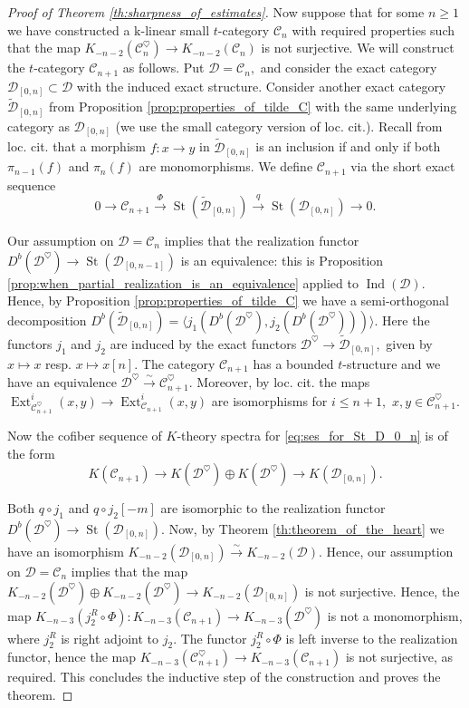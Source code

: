 \documentclass[11pt,leqno]{amsart}
\numberwithin{equation}{section}
\def\wt{\widetilde}
\newcommand{\xto}{\xrightarrow}
\newcommand{\St}{\operatorname{St}}
\newcommand{\mk}{\mathrm k}
\newcommand{\cD}{{\mathcal D}}
\newcommand{\cC}{{\mathcal C}}
\newcommand{\la}{\langle}
\newcommand{\ra}{\rangle}
\newcommand{\Ext}{\operatorname{Ext}}
\newcommand{\Ind}{\operatorname{Ind}}
\begin{document}
\begin{proof}[Proof of Theorem \ref{th:sharpness_of_estimates}]
Now suppose that for some $n\geq 1$ we have constructed a $\mk$-linear small $t$-category $\cC_n$ with required properties such that the map $K_{-n-2}(\cC_n^{\heartsuit})\to K_{-n-2}(\cC_n)$ is not surjective. We will construct the $t$-category $\cC_{n+1}$ as follows. Put $\cD=\cC_n,$ and consider the exact 
category $\cD_{[0,n]}\subset\cD$ with the induced exact structure. Consider another exact category $\wt{\cD}_{[0,n]}$ from Proposition 
\ref{prop:properties_of_tilde_C} with the same underlying category as $\cD_{[0,n]}$ (we use the small category version of loc. cit.). Recall from loc. cit. that a morphism $f:x\to y$ in $\wt{\cD}_{[0,n]}$ is an inclusion if and only if both 
$\pi_{n-1}(f)$ and $\pi_n(f)$ are monomorphisms. We define $\cC_{n+1}$ via the short exact sequence
\begin{equation}\label{eq:ses_for_St_D_0_n}
0\to\cC_{n+1}\xto{\Phi} \St(\wt{\cD}_{[0,n]})\xto{q} \St(\cD_{[0,n]})\to 0.
\end{equation}

Our assumption on $\cD=\cC_n$ implies that the realization functor $D^b(\cD^{\heartsuit})\to\St(\cD_{[0,n-1]})$ is an equivalence: this is Proposition \ref{prop:when_partial_realization_is_an_equivalence} applied to $\Ind(\cD).$ Hence, by Proposition \ref{prop:properties_of_tilde_C} we have a semi-orthogonal decomposition $D^b(\wt{\cD}_{[0,n]})=\la j_1(D^b(\cD^{\heartsuit}), j_2(D^b(\cD^{\heartsuit})))\ra.$ Here the functors $j_1$ and $j_2$ are induced by the exact functors $\cD^{\heartsuit}\to \wt{\cD}_{[0,n]},$ given by $x\mapsto x$ resp. $x\mapsto x[n].$ The category $\cC_{n+1}$ has a bounded $t$-structure and we have an equivalence $\cD^{\heartsuit}\xto{\sim}\cC_{n+1}^{\heartsuit}.$ Moreover, by loc. cit. the maps $\Ext^i_{\cC_{n+1}^{\heartsuit}}(x,y)\to \Ext^i_{\cC_{n+1}}(x,y)$ are isomorphisms for $i\leq n+1,$ $x,y\in\cC_{n+1}^{\heartsuit}.$ 

Now the cofiber sequence of $K$-theory spectra for \eqref{eq:ses_for_St_D_0_n} is of the form
\begin{equation*}
K(\cC_{n+1})\to K(\cD^{\heartsuit})\oplus K(\cD^{\heartsuit})\to K(\cD_{[0,n]}).
\end{equation*}

Both $q\circ j_1$ and $q\circ j_2[-m]$ are isomorphic to the realization functor $D^b(\cD^{\heartsuit})\to \St(\cD_{[0,n]}).$ Now, by Theorem \ref{th:theorem_of_the_heart} we have an isomorphism $K_{-n-2}(\cD_{[0,n]})\xto{\sim} K_{-n-2}(\cD).$ Hence, our assumption on $\cD=\cC_n$ implies that the map $K_{-n-2}(\cD^{\heartsuit})\oplus K_{-n-2}(\cD^{\heartsuit})\to K_{-n-2}(\cD_{[0,n]})$ is not surjective. Hence, the map $K_{-n-3}(j_2^R\circ \Phi):K_{-n-3}(\cC_{n+1})\to K_{-n-3}(\cD^{\heartsuit})$ is not a monomorphism, where $j_2^R$ is right adjoint to $j_2.$ The functor $j_2^R\circ \Phi$ is left inverse to the realization functor, hence the map $K_{-n-3}(\cC_{n+1}^{\heartsuit})\to K_{-n-3}(\cC_{n+1})$ is not surjective, as required. This concludes the inductive step of the construction and proves the theorem. 
\end{proof}
\end{document}
